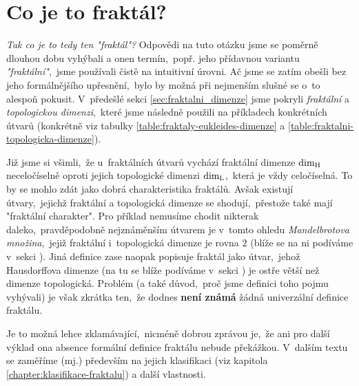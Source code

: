 \section{Co je to fraktál?}\label{sec:co-je-to-fraktal}
\emph{Tak co je to tedy ten "fraktál"?} Odpovědi na tuto otázku jsme se poměrně dlouhou dobu vyhýbali a onen termín,~popř. jeho přídavnou variantu \emph{"fraktální"},~jsme používali čistě na intuitivní úrovni. Ač jsme se zatím obešli bez jeho formálnějšího upřesnění,~bylo by možná při nejmenším slušné se o~to alespoň pokusit. V~předešlé sekci \ref{sec:fraktalni_dimenze} jsme pokryli \emph{fraktální} a \emph{topologickou dimenzi},~které jsme následně použili na příkladech konkrétních útvarů (konkrétně viz tabulky \ref{table:fraktaly-eukleides-dimenze} a \ref{table:fraktalni-topologicka-dimenze}).

Již jsme si všimli,~že u~fraktálních útvarů vychází fraktální dimenze $\operatorname{dim_H}$ neceločíselně oproti jejich topologické dimenzi $\operatorname{dim_L}$,~která je vždy celočíselná. To by se mohlo zdát jako dobrá charakteristika fraktálů. Avšak existují útvary,~jejichž fraktální a topologická dimenze se shodují,~přestože také mají "fraktální charakter". Pro příklad nemusíme chodit nikterak daleko,~pravděpodobně nejznáměnším útvarem je v~tomto ohledu \emph{Mandelbrotova množina},~jejiž fraktální i~topologická dimenze je rovna $2$ (blíže se na ni podíváme v~sekci ). Jiná definice zase naopak popisuje fraktál jako útvar,~jehož Hausdorffova dimenze (na tu se blíže podíváme v~sekci ) je ostře větší než dimenze topologická. Problém (a také důvod,~proč jsme definici toho pojmu vyhývali) je však zkrátka ten,~že dodnes \textbf{není známá} žádná univerzální definice fraktálu. \cite[str. 226]{Voracova2022}

Je to možná lehce zklamávající,~nicméně dobrou zprávou je,~že ani pro další výklad ona absence formální definice fraktálu nebude překážkou. V~dalším textu se zaměříme (mj.) především na jejich klasifikaci (viz kapitola \ref{chapter:klasifikace-fraktalu}) a další vlastnosti.
